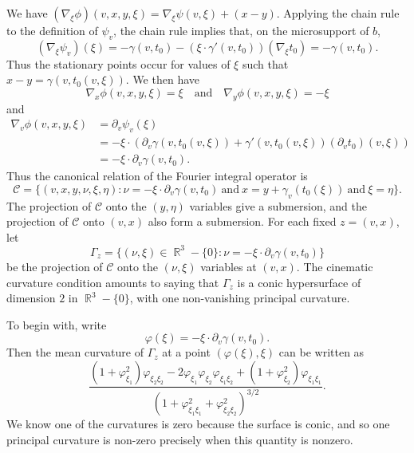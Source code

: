\documentclass{article}
\theoremstyle{plain}
\theoremstyle{remark}
\theoremstyle{definition}
\DeclareMathOperator{\RR}{\mathbb{R}}
\begin{document}
We have $(\nabla_\xi \phi)(v,x,y,\xi) = \nabla_\xi \psi(v,\xi) + (x - y)$. Applying the chain rule to the definition of $\psi_v$, the chain rule implies that, on the microsupport of $b$,
%
\[ (\nabla_\xi \psi_v)(\xi) = - \gamma(v,t_0) - (\xi \cdot \gamma'(v,t_0)) (\nabla_\xi t_0) = - \gamma(v,t_0). \]
%
Thus the stationary points occur for values of $\xi$ such that $x - y = \gamma(v,t_0(v,\xi))$. We then have
%
\[ \nabla_x \phi(v,x,y,\xi) = \xi \quad\text{and}\quad \nabla_y \phi(v,x,y,\xi) = - \xi \]
%
and
\begin{align*}
	\nabla_v \phi(v,x,y,\xi) &= \partial_v \psi_v(\xi)\\
	&= - \xi \cdot \left( \partial_v \gamma(v,t_0(v,\xi)) + \gamma'(v, t_0(v,\xi)) (\partial_v t_0)(v,\xi) \right)\\
	&= - \xi \cdot \partial_v \gamma(v,t_0).
\end{align*}
%
Thus the canonical relation of the Fourier integral operator is
%
\[ \mathcal{C} = \Big\{ (v,x,y,\nu,\xi,\eta) : \nu = - \xi \cdot \partial_v \gamma(v,t_0)\ \text{and}\ x = y + \gamma_v(t_0(\xi))\ \text{and}\ \xi = \eta \Big\}. \]
%
The projection of $\mathcal{C}$ onto the $(y,\eta)$ variables give a submersion, and the projection of $\mathcal{C}$ onto $(v,x)$ also form a submersion. For each fixed $z = (v,x)$, let
%
\[ \Gamma_z = \Big\{ (\nu,\xi) \in \RR^3 - \{ 0 \} : \nu = - \xi \cdot \partial_v \gamma(v, t_0) \Big\} \]
%
be the projection of $\mathcal{C}$ onto the $(\nu,\xi)$ variables at $(v,x)$. The cinematic curvature condition amounts to saying that $\Gamma_z$ is a conic hypersurface of dimension $2$ in $\RR^3 - \{ 0 \}$, with one non-vanishing principal curvature.

To begin with, write
%
\[ \varphi(\xi) = - \xi \cdot \partial_v \gamma(v,t_0). \]
%
Then the mean curvature of $\Gamma_z$ at a point $(\varphi(\xi),\xi)$ can be written as
%
\[ \frac{(1 + \varphi_{\xi_1}^2) \varphi_{\xi_2 \xi_2} - 2 \varphi_{\xi_1} \varphi_{\xi_2} \varphi_{\xi_1 \xi_2} + (1 + \varphi_{\xi_2}^2) \varphi_{\xi_1 \xi_1}}{(1 + \varphi_{\xi_1 \xi_1}^2 + \varphi_{\xi_2 \xi_2}^2)^{3/2}}. \]
%
We know one of the curvatures is zero because the surface is conic, and so one principal curvature is non-zero precisely when this quantity is nonzero.
\end{document}
